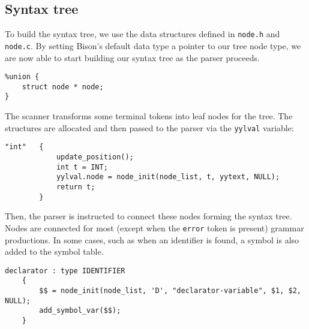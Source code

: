 
\subsection{Syntax tree}
To build the syntax tree, we use the data structures defined in \texttt{node.h} and \texttt{node.c}.
By setting Bison's default data type a pointer to our tree node type, we are now able to start
building our syntax tree as the parser proceeds.
\begin{lstlisting}
%union {
	struct node * node;
}
\end{lstlisting}

The scanner transforms some terminal tokens into leaf nodes for the tree. The structures
are allocated and then passed to the parser via the \texttt{yylval} variable:

\begin{lstlisting}[caption={Example of a lexer rule where a leaf node is created.
This procedure is preformed for
all data types, identifiers and constants.},captionpos=b]
"int"	{
			update_position();
			int t = INT;
			yylval.node = node_init(node_list, t, yytext, NULL);
			return t;
		}
\end{lstlisting}

Then, the parser is instructed to connect these nodes forming the syntax tree.
Nodes are connected for most (except when the \texttt{error} token is present)
grammar productions. In some cases, such as when an identifier is found, a symbol is also added
to the symbol table.

\begin{lstlisting}[caption={Example of a parser rule where nodes are connected.
This procedure is preformed for all productions, except error handlers. Here, a symbol
is also added to the symbol table through the function \texttt{add\_symbol\_var}},captionpos=b]
declarator : type IDENTIFIER 
	{
		$$ = node_init(node_list, 'D', "declarator-variable", $1, $2, NULL);
		add_symbol_var($$);
	}
\end{lstlisting}
